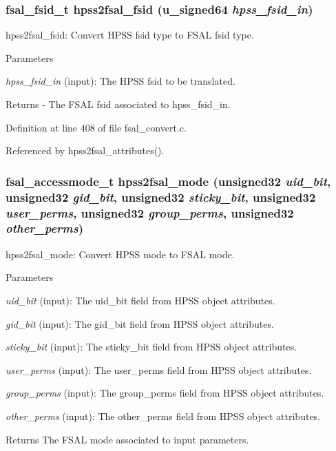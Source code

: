 \subsubsection[{hpss2fsal\_\-fsid}]{\setlength{\rightskip}{0pt plus 5cm}fsal\_\-fsid\_\-t hpss2fsal\_\-fsid (u\_\-signed64 {\em hpss\_\-fsid\_\-in})}\label{fsal__convert_8c_ac54c0723f79f51a9516feb8d7ccfc0d8}
hpss2fsal\_\-fsid: Convert HPSS fsid type to FSAL fsid type.


\begin{DoxyParams}{Parameters}
\item[{\em hpss\_\-fsid\_\-in}](input): The HPSS fsid to be translated.\end{DoxyParams}
\begin{DoxyReturn}{Returns}
-\/ The FSAL fsid associated to hpss\_\-fsid\_\-in. 
\end{DoxyReturn}


Definition at line 408 of file fsal\_\-convert.c.

Referenced by hpss2fsal\_\-attributes().
\subsubsection[{hpss2fsal\_\-mode}]{\setlength{\rightskip}{0pt plus 5cm}fsal\_\-accessmode\_\-t hpss2fsal\_\-mode (unsigned32 {\em uid\_\-bit}, \/  unsigned32 {\em gid\_\-bit}, \/  unsigned32 {\em sticky\_\-bit}, \/  unsigned32 {\em user\_\-perms}, \/  unsigned32 {\em group\_\-perms}, \/  unsigned32 {\em other\_\-perms})}\label{fsal__convert_8c_adcccec129d19a0f7a97aeb76420caf4e}
hpss2fsal\_\-mode: Convert HPSS mode to FSAL mode.


\begin{DoxyParams}{Parameters}
\item[{\em uid\_\-bit}](input): The uid\_\-bit field from HPSS object attributes. \item[{\em gid\_\-bit}](input): The gid\_\-bit field from HPSS object attributes. \item[{\em sticky\_\-bit}](input): The sticky\_\-bit field from HPSS object attributes. \item[{\em user\_\-perms}](input): The user\_\-perms field from HPSS object attributes. \item[{\em group\_\-perms}](input): The group\_\-perms field from HPSS object attributes. \item[{\em other\_\-perms}](input): The other\_\-perms field from HPSS object attributes.\end{DoxyParams}
\begin{DoxyReturn}{Returns}
The FSAL mode associated to input parameters. 
\end{DoxyReturn}


